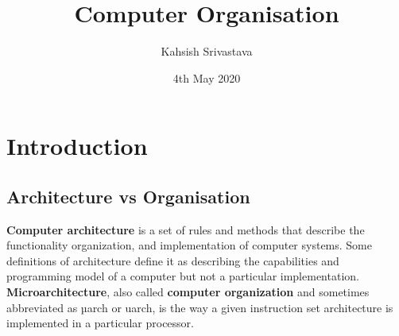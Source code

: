 \documentclass[a4paper,12pt]{book}
\title{Computer Organisation}
\date{4th May 2020}
\author{Kahsish Srivastava}
\begin{document}
\maketitle
{}
\newpage
\tableofcontents
\newpage
{}

\chapter{Introduction}
\section{Architecture vs Organisation}

\textbf{Computer architecture} is a set of rules and methods that describe the functionality
organization, and implementation of computer systems. Some definitions of architecture 
define it as describing the capabilities and programming model of a computer but not a 
particular implementation.\\

\textbf{Microarchitecture}, also called \textbf{computer organization} and sometimes abbreviated
 as µarch or uarch, is the way a given instruction set architecture is implemented in a particular 
 processor.
\end{document}
